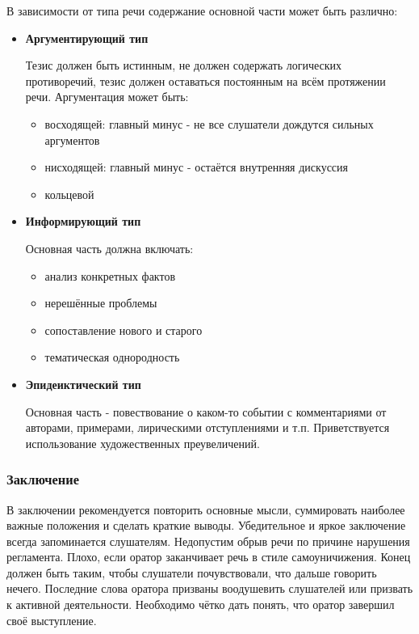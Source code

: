 В зависимости от типа речи содержание основной части может быть различно:
\begin{itemize}
	\item \textbf{Аргументирующий тип}
	
	Тезис должен быть истинным, не должен содержать логических противоречий, тезис должен оставаться постоянным на всём протяжении речи. Аргументация может быть:
	\begin{itemize} 
		\item восходящей: главный минус - не все слушатели дождутся сильных аргументов
		\item нисходящей: главный минус - остаётся внутренняя дискуссия
		\item кольцевой
	\end{itemize}
	
	\item \textbf{Информирующий тип}
	
	Основная часть должна включать:
	\begin{itemize}
		\item анализ конкретных фактов
		\item нерешённые проблемы
		\item сопоставление нового и старого
		\item тематическая однородность
	\end{itemize} 
	
	\item \textbf{Эпидеиктический тип}
	
	Основная часть - повествование о каком-то событии с комментариями от авторами, примерами, лирическими отступлениями и т.п. Приветствуется использование художественных преувеличений.
\end{itemize}

\subsubsection{Заключение}

В заключении рекомендуется повторить основные
мысли, суммировать наиболее важные положения и сделать краткие
выводы. Убедительное и яркое заключение всегда запоминается
слушателям. Недопустим обрыв речи по причине нарушения регламента. Плохо, если оратор заканчивает речь в стиле самоуничижения.
Конец должен быть таким, чтобы слушатели почувствовали, что
дальше говорить нечего. Последние слова оратора призваны воодушевить слушателей или призвать к активной деятельности. Необходимо чётко дать понять, что оратор завершил своё выступление.